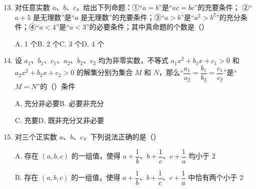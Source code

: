 \documentclass[a4paper,11pt]{article}
\begin{document}
\begin{enumerate}
\setcounter{enumi}{12}

\item 对任意实数 $a$、$b$、$c$，给出下列命题：①“$a=b$”是“$ac=bc$”的充要条件；
②“$a+5$ 是无理数”是“$a$ 是无理数”的充要条件；③“$a>b$”是“$a^2>b^2$”的充分条
件；④“$a<4$”是“$a<3$”的必要条件；其中真命题的个数是\mbox{（\quad）}

\keepwithprev
A. 1 个\qquad B. 2 个\qquad C. 3 个\qquad D. 4 个

\ifanswer
\solbegin
{}
\solend

\fi

\item 设 $a_1$、$b_1$、$c_1$、$a_2$、$b_2$、$c_2$ 均为非零实数，不等式 $a_1x^2+b_1x+c_1>0$ 和 $a_2x^2+b_2x+c_2>0$ 的解集分别为集合 $M$ 和 $N$，那么“$\dfrac{a_1}{a_2}=\dfrac{b_1}{b_2}=\dfrac{c_1}{c_2}$”是“$M=N$”的\mbox{（\quad）}条件

\keepwithprev
A. 充分非必要\qquad B. 必要非充分

C. 充要\qquad\qquad D. 既非充分又非必要

\ifanswer
\solbegin
{}
\solend

\fi

\item 对三个正实数 $a$、$b$、$c$，下列说法正确的是\mbox{（\quad）}

\keepwithprev
A. 存在 $(a,b,c)$ 的一组值，使得 $a+\dfrac1b$、$b+\dfrac1c$、$c+\dfrac1a$ 均小于 $2$

B. 存在 $(a,b,c)$ 的一组值，使得 $a+\dfrac1b$、$b+\dfrac1c$、$c+\dfrac1a$ 中恰有两个小于 $2$


\end{enumerate}
\end{document}
